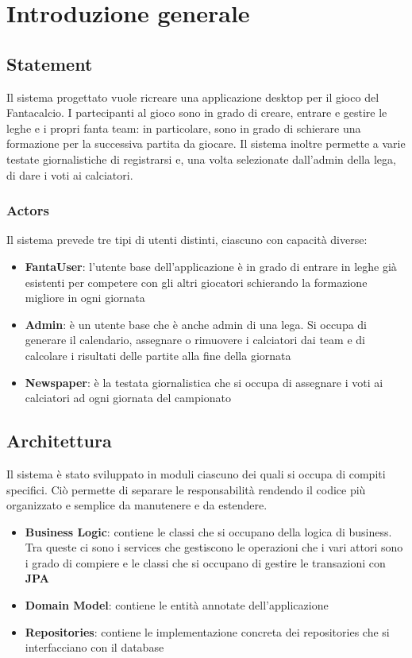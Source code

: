 \section{Introduzione generale}

\subsection{Statement}
Il sistema progettato vuole ricreare una applicazione desktop per il gioco del
Fantacalcio. I partecipanti al gioco sono in grado di creare, entrare e gestire le leghe e i 
propri fanta team: in particolare, sono in grado di schierare una formazione per la successiva partita
da giocare. Il sistema inoltre permette a varie testate giornalistiche di registrarsi e, 
una volta selezionate dall'admin della lega, di dare i voti ai calciatori.
\subsubsection{Actors}
Il sistema prevede tre tipi di utenti distinti, ciascuno con capacità diverse:
\begin{itemize}
    \item \textbf{FantaUser}: l'utente base dell'applicazione è in grado di entrare in leghe già esistenti per
    competere con gli altri giocatori schierando la formazione migliore in ogni giornata
    \item \textbf{Admin}: è un utente base che è anche admin di una lega. Si occupa di generare il calendario,  
    assegnare o rimuovere i calciatori dai team e di calcolare i risultati delle partite alla fine della giornata
    \item \textbf{Newspaper}: è la testata giornalistica che si occupa di assegnare i voti ai calciatori ad ogni giornata del campionato
\end{itemize}

\subsection{Architettura}
Il sistema è stato sviluppato in moduli ciascuno dei quali si occupa di compiti specifici.
Ciò permette di separare le responsabilità rendendo il codice più organizzato e semplice 
da manutenere e da estendere.
\begin{itemize}
    \item \textbf{Business Logic}: contiene le classi che si occupano della logica di 
    business. Tra queste ci sono i services che gestiscono le operazioni che i vari 
    attori sono i grado di compiere e le classi che si occupano di gestire le transazioni con \textbf{JPA}
    \item \textbf{Domain Model}: contiene le entità annotate dell'applicazione
    \item \textbf{Repositories}: contiene le implementazione concreta dei repositories che si interfacciano con il database
\end{itemize}
